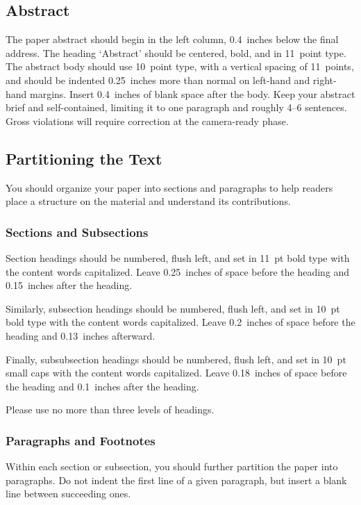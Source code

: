 \subsection{Abstract}

The paper abstract should begin in the left column, 0.4~inches below the final
address. The heading `Abstract' should be centered, bold, and in 11~point type.
The abstract body should use 10~point type, with a vertical spacing of
11~points, and should be indented 0.25~inches more than normal on left-hand and
right-hand margins. Insert 0.4~inches of blank space after the body. Keep your
abstract brief and self-contained, limiting it to one paragraph and roughly 4--6
sentences. Gross violations will require correction at the camera-ready phase.

\subsection{Partitioning the Text}

You should organize your paper into sections and paragraphs to help
readers place a structure on the material and understand its
contributions.

\subsubsection{Sections and Subsections}

Section headings should be numbered, flush left, and set in 11~pt bold
type with the content words capitalized. Leave 0.25~inches of space
before the heading and 0.15~inches after the heading.

Similarly, subsection headings should be numbered, flush left, and set
in 10~pt bold type with the content words capitalized. Leave
0.2~inches of space before the heading and 0.13~inches afterward.

Finally, subsubsection headings should be numbered, flush left, and
set in 10~pt small caps with the content words capitalized. Leave
0.18~inches of space before the heading and 0.1~inches after the
heading.

Please use no more than three levels of headings.

\subsubsection{Paragraphs and Footnotes}

Within each section or subsection, you should further partition the
paper into paragraphs. Do not indent the first line of a given
paragraph, but insert a blank line between succeeding ones.

